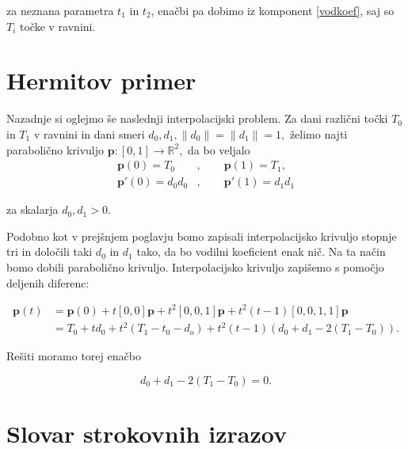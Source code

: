 \documentclass[mat1]{fmfdelo}
\newcommand{\R}{\mathbb R}
\begin{document}
za neznana parametra $t_1$ in $t_2$, enačbi pa dobimo iz komponent \eqref{vodkoef}, saj so $T_i$ točke v ravnini.




\section{Hermitov primer}

Nazadnje si oglejmo še naslednji interpolacijski problem. Za dani različni točki $T_0$ in $T_1$ v ravnini in dani smeri $d_0, d_1, \lVert d_0 \rVert = \lVert d_1 \rVert = 1,$ želimo najti parabolično krivuljo $\textbf{p} : [ 0, 1 ] \rightarrow \R^2,$ da bo veljalo
\begin{align*}
\textbf{p}(0) = T_0&, \qquad \textbf{p}(1) = T_1, \\
\textbf{p}'(0) = d_0 d_0&, \qquad \textbf{p}'(1) = d_1 d_1 
\end{align*}

za skalarja $d_0, d_1 > 0$.

Podobno kot v prejšnjem poglavju bomo zapisali interpolacijsko krivuljo stopnje tri in določili taki $d_0$ in $d_1$ tako, da bo vodilni koeficient enak nič. Na ta način bomo dobili parabolično krivuljo. Interpolacijsko krivuljo zapišemo s pomočjo deljenih diferenc:

\begin{align*}
\textbf{p}(t) &= \textbf{p}(0) + t [0,0]\textbf{p} + t^2[0,0,1]\textbf{p} + t^2(t - 1)[0,0,1,1]\textbf{p} \\
	&= T_0 + t d_0 + t^2(T_1 - t_0 - d_o) + t^2(t - 1)(d_0 + d_1 - 2(T_1 - T_0))
.\end{align*}

Rešiti moramo torej enačbo

\begin{equation}
d_0 + d_1 - 2(T_1 - T_0) = 0
.\end{equation}


\section*{Slovar strokovnih izrazov}

\geslo{}{}
\geslo{}{}


\begin{thebibliography}{99}


\end{thebibliography}
\end{document}
